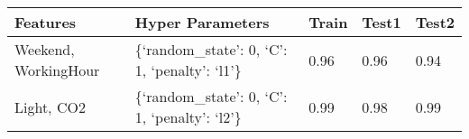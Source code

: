 \documentclass[11pt]{article}
\begin{document}
    \begin{longtable}[]{@{}lllll@{}}
\toprule
\begin{minipage}[b]{0.28\columnwidth}\raggedright
Features\strut
\end{minipage} & \begin{minipage}[b]{0.39\columnwidth}\raggedright
Hyper Parameters\strut
\end{minipage} & \begin{minipage}[b]{0.06\columnwidth}\raggedright
Train\strut
\end{minipage} & \begin{minipage}[b]{0.06\columnwidth}\raggedright
Test1\strut
\end{minipage} & \begin{minipage}[b]{0.06\columnwidth}\raggedright
Test2\strut
\end{minipage}\tabularnewline
\midrule
\endhead
\begin{minipage}[t]{0.28\columnwidth}\raggedright
Weekend, WorkingHour\strut
\end{minipage} & \begin{minipage}[t]{0.39\columnwidth}\raggedright
\{`random\_state': 0, `C': 1, `penalty': `l1'\}\strut
\end{minipage} & \begin{minipage}[t]{0.06\columnwidth}\raggedright
0.96\strut
\end{minipage} & \begin{minipage}[t]{0.06\columnwidth}\raggedright
0.96\strut
\end{minipage} & \begin{minipage}[t]{0.06\columnwidth}\raggedright
0.94\strut
\end{minipage}\tabularnewline
\begin{minipage}[t]{0.28\columnwidth}\raggedright
Light, CO2\strut
\end{minipage} & \begin{minipage}[t]{0.39\columnwidth}\raggedright
\{`random\_state': 0, `C': 1, `penalty': `l2'\}\strut
\end{minipage} & \begin{minipage}[t]{0.06\columnwidth}\raggedright
0.99\strut
\end{minipage} & \begin{minipage}[t]{0.06\columnwidth}\raggedright
0.98\strut
\end{minipage} & \begin{minipage}[t]{0.06\columnwidth}\raggedright
0.99\strut
\end{minipage}\tabularnewline

\end{longtable}
\end{document}
